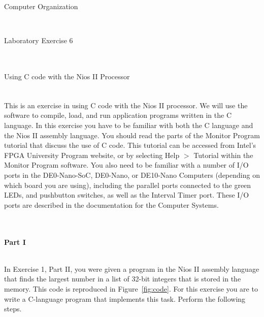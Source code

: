 \documentclass[epsfig,10pt,fullpage]{article}
\newcommand{\LabNum}{6}
\begin{document}
\centerline{\huge Computer Organization}
~\\
\centerline{\huge Laboratory Exercise \LabNum}
~\\
\centerline{\large Using C code with the Nios\textsuperscript{\textregistered} II Processor}
~\\

\noindent
This is an exercise in using C code with the Nios\textsuperscript{\textregistered} II processor.  We will use 
the {\it \productNameMedTM{}} software to compile, load, and run application programs
written in the C language.  In this exercise you have to be familiar with both the C language 
and the Nios II assembly language.  You should read the parts of the Monitor Program tutorial that 
discuss the use of C code.  This tutorial can be accessed from Intel's FPGA University Program 
website, or by selecting {\sf Help $>$ Tutorial} within the Monitor Program software.
You also need to be familiar with a number of I/O ports in the DE0-Nano-SoC, DE0-Nano, or DE10-Nano Computers (depending on which board you are using), 
including the parallel ports connected to the green LEDs, and pushbutton switches, as well as 
the Interval Timer port. These I/O ports are described in the documentation for the Computer Systems. 

~\\
~\\
\noindent
{\bf Part I}

~\\
\noindent
In Exercise 1, Part II, you were given a program in the Nios II assembly language that finds the 
largest number in a list of 32-bit integers that is stored in the memory.  This code is 
reproduced in Figure~\ref{fig:code}. For this exercise you are to write a C-language program 
that implements this task.  Perform the following steps.
\end{document}
